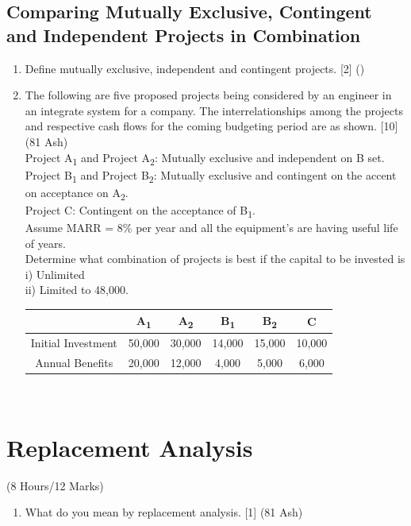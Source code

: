 \documentclass[12pt]{article}
\newcommand{\sub}[1]{\textsubscript{#1}}
\begin{document}
\subsection{Comparing Mutually Exclusive, Contingent and Independent Projects in Combination}
\begin{enumerate}[noitemsep, topsep = 0pt]
	\item Define mutually exclusive, independent and contingent projects. \hfill [2] ()
	\item The following are five proposed projects being considered by an engineer in an integrate system for a company. The interrelationships among the projects and respective cash flows for the coming budgeting period are as shown. \hfill [10] (81 Ash)\\
	Project A\sub{1} and Project A\sub{2}: Mutually exclusive and independent on B set.\\
	Project B\sub{1} and Project B\sub{2}: Mutually exclusive and contingent on the accent on acceptance on A\sub{2}.\\
	Project C: Contingent on the acceptance of B\sub{1}.\\
	Assume MARR = 8\% per year and all the equipment's are having useful life of years.\\
	Determine what combination of projects is best if the capital to be invested is\\
	i) Unlimited\\
	ii) Limited to 48,000.\\
	\begin{tabular}{|c|c|c|c|c|c|}
		\hline
		 & A\sub{1} & A\sub{2} & B\sub{1} & B\sub{2} & C \\ \hline
		Initial Investment & 50,000 & 30,000 & 14,000 & 15,000 & 10,000 \\ \hline
		Annual Benefits & 20,000 & 12,000 & 4,000 & 5,000 & 6,000 \\ \hline
	\end{tabular}\\[0pt]
	
\end{enumerate}

\pagebreak
\section{Replacement Analysis}
\begin{center}(8 Hours/12 Marks)\end{center}
\begin{enumerate}[noitemsep, topsep = 0pt]
	\item What do you mean by replacement analysis. \hfill [1] (81 Ash)
\end{enumerate}
\end{document}
